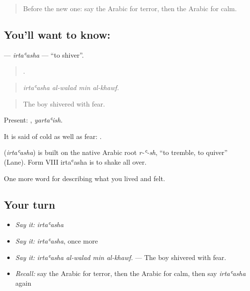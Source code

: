 \label{lesson:AR-C489-irtaasha}



\begin{quote}
Before the new one: say the Arabic for terror, then the Arabic for calm.
\end{quote}

\subsection*{You'll want to know: }
\textbf{} — \emph{irtaʿasha} — \textquotedblleft{}to shiver\textquotedblright{}.

\begin{quote}
   .
\end{quote}

\begin{quote}
\emph{irtaʿasha al-walad min al-khawf.}
\end{quote}

\begin{quote}
The boy shivered with fear.
\end{quote}

Present: , \emph{yartaʿish}.

It is said of cold as well as fear:   .

\begin{cousinweb}
\textbf{} (\emph{irtaʿasha}) is built on the native Arabic root \emph{r-ʿ-sh}, \textquotedblleft{}to tremble, to quiver\textquotedblright{} (Lane). Form VIII irtaʿasha is to shake all over.
\end{cousinweb}

\begin{grammarlens}[title={What you've built}]
One more word for describing what you lived and felt.
\end{grammarlens}

\subsection*{Your turn}
\begin{itemize}
\raggedright
  \item \emph{Say it:} \emph{irtaʿasha}
  \item \emph{Say it:} \emph{irtaʿasha}, once more
  \item \emph{Say it:} \emph{irtaʿasha al-walad min al-khawf.} — The boy shivered with fear.
  \item \emph{Recall:} say the Arabic for terror, then the Arabic for calm, then say \emph{irtaʿasha} again
\end{itemize}

